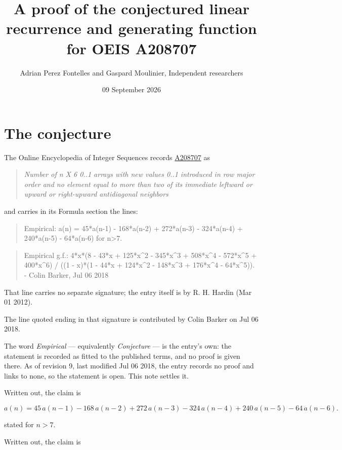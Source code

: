 \documentclass[11pt]{article}
\title{A proof of the conjectured linear recurrence and generating function for OEIS A208707}
\author{Adrian Perez Fontelles and Gaspard Moulinier, Independent researchers}
\date{09 September 2026}
\theoremstyle{definition}
\begin{document}
\maketitle
\section{The conjecture}

The Online Encyclopedia of Integer Sequences records \href{https://oeis.org/A208707}{A208707} as

\begin{quote}\itshape Number of n X 6 0..1 arrays with new values 0..1 introduced in row major order and no element equal to more than two of its immediate leftward or upward or right-upward antidiagonal neighbors\end{quote}

and carries in its Formula section the lines:

\begin{quote}\ttfamily Empirical: a(n) = 45*a(n-1) - 168*a(n-2) + 272*a(n-3) - 324*a(n-4) + 240*a(n-5) - 64*a(n-6) for n>7.\end{quote}

\begin{quote}\ttfamily Empirical g.f.: 4*x*(8 - 43*x + 125*x\textasciicircum{}2 - 345*x\textasciicircum{}3 + 508*x\textasciicircum{}4 - 572*x\textasciicircum{}5 + 400*x\textasciicircum{}6) / ((1 - x)*(1 - 44*x + 124*x\textasciicircum{}2 - 148*x\textasciicircum{}3 + 176*x\textasciicircum{}4 - 64*x\textasciicircum{}5)). - Colin Barker, Jul 06 2018\end{quote}

That line carries no separate signature; the entry itself is by R. H. Hardin (Mar 01 2012).

The line quoted ending in that signature is contributed by Colin Barker on Jul 06 2018.

The word {\itshape Empirical} --- equivalently {\itshape Conjecture} --- is the entry's own: the statement is recorded as fitted to the published terms, and no proof is given there. As of revision 9, last modified Jul 06 2018, the entry records no proof and links to none, so the statement is open. This note settles it.

Written out, the claim is

\[a(n) = 45\,a(n-1) - 168\,a(n-2) + 272\,a(n-3) - 324\,a(n-4) + 240\,a(n-5) - 64\,a(n-6).\]

stated for $n > 7$.

Written out, the claim is
\end{document}
